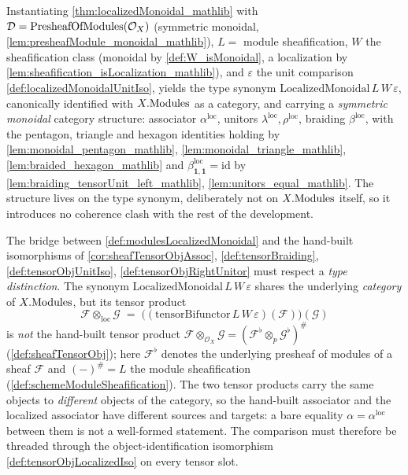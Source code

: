 \begin{definition}
  \label{def:modulesLocalizedMonoidal}
  Instantiating \cref{thm:localizedMonoidal_mathlib} with
  \(\mathcal{D} = \mathrm{PresheafOfModules}(\mathcal{O}_X)\) (symmetric monoidal,
  \cref{lem:presheafModule_monoidal_mathlib}), \(L = \) module sheafification,
  \(W\) the sheafification class (monoidal by \cref{def:W_isMonoidal}, a
  localization by \cref{lem:sheafification_isLocalization_mathlib}), and
  \(\varepsilon\) the unit comparison \cref{def:localizedMonoidalUnitIso}, yields
  the type synonym \(\mathrm{LocalizedMonoidal}\,L\,W\,\varepsilon\), canonically
  identified with \(X.\mathrm{Modules}\) as a category, and carrying a \emph{symmetric monoidal}
  category structure: associator \(\alpha^{\mathrm{loc}}\), unitors
  \(\lambda^{\mathrm{loc}}, \rho^{\mathrm{loc}}\), braiding \(\beta^{\mathrm{loc}}\),
  with the pentagon, triangle and hexagon identities holding by
  \cref{lem:monoidal_pentagon_mathlib}, \cref{lem:monoidal_triangle_mathlib},
  \cref{lem:braided_hexagon_mathlib} and \(\beta^{\mathrm{loc}}_{\mathbf{1},
  \mathbf{1}} = \mathrm{id}\) by
  \cref{lem:braiding_tensorUnit_left_mathlib}, \cref{lem:unitors_equal_mathlib}.
  The structure lives on the type synonym, deliberately not on \(X.\mathrm{Modules}\)
  itself, so it introduces no coherence clash with the rest of the development.
\end{definition}

\providecommand{\lotimes}{\mathbin{\otimes_{\mathrm{loc}}}}

The bridge between \cref{def:modulesLocalizedMonoidal} and the hand-built
isomorphisms of \cref{cor:sheafTensorObjAssoc}, \cref{def:tensorBraiding},
\cref{def:tensorObjUnitIso}, \cref{def:tensorObjRightUnitor} must respect a
\emph{type distinction}. The synonym
\(\mathrm{LocalizedMonoidal}\,L\,W\,\varepsilon\) shares the underlying
\emph{category} of \(X.\mathrm{Modules}\), but its tensor product
\[
  \mathcal{F} \lotimes \mathcal{G}
    \;=\; \bigl((\mathrm{tensorBifunctor}\,L\,W\,\varepsilon)(\mathcal{F})\bigr)(\mathcal{G})
\]
is \emph{not} the hand-built tensor product
\(\mathcal{F} \otimes_{\mathcal{O}_X} \mathcal{G} =
(\mathcal{F}^{\flat} \otimes_p \mathcal{G}^{\flat})^{\#}\)
(\cref{def:sheafTensorObj}); here \(\mathcal{F}^{\flat}\) denotes the underlying
presheaf of modules of a sheaf \(\mathcal{F}\) and \((-)^{\#} = L\) the module
sheafification (\cref{def:schemeModuleSheafification}). The two tensor products
carry the same objects to \emph{different} objects of the category, so the
hand-built associator and the localized associator have different sources and
targets: a bare equality \(\alpha = \alpha^{\mathrm{loc}}\) between them is not a
well-formed statement. The comparison must therefore be threaded through the
object-identification isomorphism \cref{def:tensorObjLocalizedIso} on every tensor
slot.

